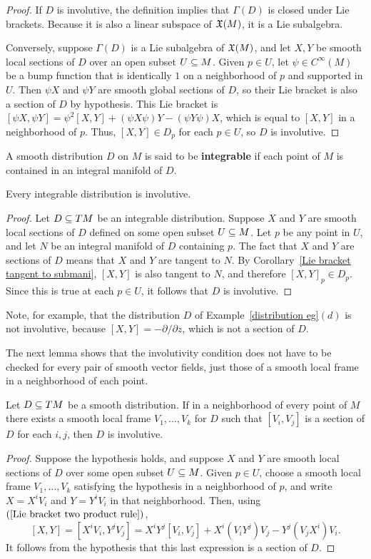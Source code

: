 \begin{proof}
If $D$ is involutive, the definition implies that $\Gamma(D)$ is closed under Lie brackets. Because it is also a linear subspace of $\mathfrak{X}(M)$, 
it is a Lie subalgebra.\par
Conversely, suppose $\Gamma(D)$ is a Lie subalgebra of $\mathfrak{X}(M)$, and let $X,Y$ be smooth local sections of $D$ over an open subset $U\subseteq M$. 
Given $p\in U$, let $\psi\in C^\infty(M)$ be a bump function that is identically $1$ on a neighborhood of $p$ and supported in $U$. Then $\psi X$ 
and $\psi Y$ are smooth global sections of $D$, so their Lie bracket is also a section of $D$ by hypothesis. This Lie bracket is 
$[\psi X,\psi Y]=\psi^2[X,Y]+(\psi X\psi)Y-(\psi Y\psi)X$, which is equal to $[X,Y]$ in a neighborhood of $p$. Thus, $[X,Y]\in D_p$ for each $p\in U$, 
so $D$ is involutive.
\end{proof}
A smooth distribution $D$ on $M$ is said to be \textbf{integrable} if each point of $M$ is contained in an integral manifold of $D$.
\begin{proposition}
Every integrable distribution is involutive.
\end{proposition}
\begin{proof}
Let $D\subseteq TM$ be an integrable distribution. Suppose $X$ and $Y$ are smooth local sections of $D$ defined on some open subset $U\subseteq M$. Let $p$ be any point in $U$, and let $N$ be an integral manifold of $D$ containing $p$. The fact that $X$ and $Y$ are sections of $D$ means that $X$ and $Y$ are tangent to $N$. By Corollary~\ref{Lie bracket tangent to submani}, $[X,Y]$ is also tangent to $N$, and therefore $[X,Y]_p\in D_p$. Since this is true at each $p\in U$, it follows that $D$ is involutive.
\end{proof}
Note, for example, that the distribution $D$ of Example~\ref{distribution eg}$(d)$ is not involutive, because $[X,Y]=-\partial/\partial z$, which is not a section of $D$.\par
The next lemma shows that the involutivity condition does not have to be checked
for every pair of smooth vector fields, just those of a smooth local frame in a neighborhood of each point.
\begin{lemma}\label{involutivity local fram crit}
Let $D\subseteq TM$ be a smooth distribution. If in a neighborhood of every point of $M$ there exists a smooth local frame $V_1,\dots,V_k$ for $D$ such that $[V_i,V_j]$ is a section of $D$ for each $i,j$, then $D$ is involutive.
\end{lemma}
\begin{proof}
Suppose the hypothesis holds, and suppose $X$ and $Y$ are smooth local sections of $D$ over some open subset $U\subseteq M$. Given $p\in U$, choose a smooth local frame $V_1,\dots,V_k$ satisfying the hypothesis in a neighborhood of $p$, and write $X=X^iV_i$ and $Y=Y^iV_i$ in that neighborhood. Then, using $(\ref{Lie bracket two product rule})$,
\[[X,Y]=[X^iV_i,Y^jV_j]=X^iY^j[V_i,V_j]+X^i(V_iY^j)V_j-Y^j(V_jX^i)V_i.\]
It follows from the hypothesis that this last expression is a section of $D$.
\end{proof}
